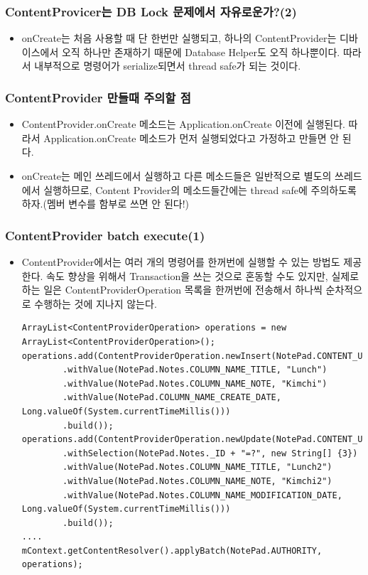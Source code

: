 \documentclass{beamer}
\newcommand\Fontvi{\fontsize{8}{9.6}\selectfont}
\begin{document}
\begin{frame}
\frametitle{ContentProvicer는 DB Lock 문제에서 자유로운가?(2)}
\begin{itemize}
\item onCreate는 처음 사용할 때 단 한번만 실행되고, 하나의 ContentProvider는 디바이스에서 오직 하나만 존재하기 때문에 Database Helper도 오직 하나뿐이다. 따라서 내부적으로 명령어가 serialize되면서 thread safe가 되는 것이다.
\end {itemize}
\end{frame}

\begin{frame}
\frametitle{ContentProvider 만들때 주의할 점}
\begin{itemize}
\item ContentProvider.onCreate 메소드는 Application.onCreate 이전에 실행된다. 따라서 Application.onCreate 메소드가 먼저 실행되었다고 가정하고 만들면 안 된다.
\item onCreate는 메인 쓰레드에서 실행하고 다른 메소드들은 일반적으로 별도의 쓰레드에서 실행하므로, Content Provider의 메소드들간에는 thread safe에 주의하도록 하자.(멤버 변수를 함부로 쓰면 안 된다!)
\end {itemize}
\end{frame}

\begin{frame}[fragile]
\frametitle{ContentProvider batch execute(1)}
\begin{itemize}
\item ContentProvider에서는 여러 개의 명령어를 한꺼번에 실행할 수 있는 방법도 제공한다. 속도 향상을 위해서 Transaction을 쓰는 것으로 혼동할 수도 있지만, 실제로 하는 일은 ContentProviderOperation 목록을 한꺼번에 전송해서 하나씩 순차적으로 수행하는 것에 지나지 않는다.
\Fontvi
\begin{verbatim} 
ArrayList<ContentProviderOperation> operations = new ArrayList<ContentProviderOperation>();
operations.add(ContentProviderOperation.newInsert(NotePad.CONTENT_URI)
    	.withValue(NotePad.Notes.COLUMN_NAME_TITLE, "Lunch")
    	.withValue(NotePad.Notes.COLUMN_NAME_NOTE, "Kimchi")
    	.withValue(NotePad.COLUMN_NAME_CREATE_DATE, Long.valueOf(System.currentTimeMillis()))
    	.build());
operations.add(ContentProviderOperation.newUpdate(NotePad.CONTENT_URI)
    	.withSelection(NotePad.Notes._ID + "=?", new String[] {3})
    	.withValue(NotePad.Notes.COLUMN_NAME_TITLE, "Lunch2")
    	.withValue(NotePad.Notes.COLUMN_NAME_NOTE, "Kimchi2")
    	.withValue(NotePad.Notes.COLUMN_NAME_MODIFICATION_DATE, Long.valueOf(System.currentTimeMillis()))
    	.build());
....
mContext.getContentResolver().applyBatch(NotePad.AUTHORITY, operations);
\end{verbatim}
\end {itemize}
\end{frame}
\end{document}
